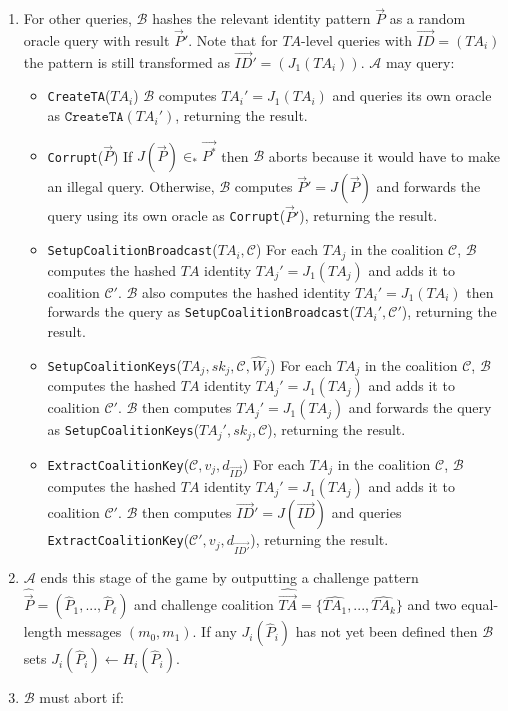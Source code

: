 \documentclass[10pt]{llncs}
\newcommand{\A}{\mathcal{A}}
\newcommand{\B}{\mathcal{B}}
\newcommand{\C}{\mathcal{C}}
\newcommand{\ID}{\mathit{ID}}
\newcommand{\TA}{\mathit{TA}}
\newcommand{\sk}{\mathit{sk}}
\begin{document}
\begin{enumerate}
	\item For other queries, $\B$ hashes the relevant identity pattern $\vec{P}$ as a random oracle query with result $\vec{P}'$. Note that for $\TA$-level queries with $\vec{\ID} = (\TA_i)$ the pattern is still transformed as $\vec{\ID}' = (J_1 (\TA_i))$. $\A$ may query:
	\begin{itemize}
		\item \texttt{CreateTA}($\TA_i$) $\B$ computes $\TA_i' = J_1(\TA_i)$ and queries its own oracle as $\texttt{CreateTA}(\TA_i')$, returning the result.
		\item \texttt{Corrupt}($\vec{P}$) If $J(\vec{P}) \in_* \vec{P^*}$ then $\B$ aborts because it would have to make an illegal query. Otherwise, $\B$ computes $\vec{P}' = J(\vec{P})$ and forwards the query using its own oracle as \texttt{Corrupt}($\vec{P}'$), returning the result.
		\item \texttt{SetupCoalitionBroadcast}($\TA_i, \C$) For each $\TA_j$ in the coalition $\C$, $\B$ computes the hashed $\TA$ identity $\TA_j' = J_1(\TA_j)$ and adds it to coalition $\C'$. $\B$ also computes the hashed identity $\TA_i' = J_1(\TA_i)$ then forwards the query as \texttt{SetupCoalitionBroadcast}($\TA_i', \C'$), returning the result.
		\item \texttt{SetupCoalitionKeys}($\TA_j, \sk_j, \C, \hat{W}_j$) For each $\TA_j$ in the coalition $\C$, $\B$ computes the hashed $\TA$ identity $\TA_j' = J_1(\TA_j)$ and adds it to coalition $\C'$. $\B$ then computes $\TA_j' = J_1(\TA_j)$ and forwards the query as \texttt{SetupCoalitionKeys}($\TA_j', \sk_j, \C$), returning the result.
		\item \texttt{ExtractCoalitionKey}($\C, v_j, d_{\vec{\ID}}$) For each $\TA_j$ in the coalition $\C$, $\B$ computes the hashed $\TA$ identity $\TA_j' = J_1(\TA_j)$ and adds it to coalition $\C'$. $\B$ then computes $\vec{\ID}' = J(\vec{\ID})$ and queries \texttt{ExtractCoalitionKey}($\C', v_j, d_{\vec{\ID'}}$), returning the result.
	\end{itemize}
	\item $\A$ ends this stage of the game by outputting a challenge pattern $\widehat{\vec{P}} = (\widehat{P}_1, ..., \widehat{P}_{\ell})$ and challenge coalition $\widehat{\vec{\TA}} = \{\widehat{\TA_1}, ..., \widehat{\TA_k}\}$ and two equal-length messages $(m_0, m_1)$. If any $J_i(\widehat{P}_i)$ has not yet been defined then $\B$ sets $J_i(\widehat{P}_i) \gets H_i(\widehat{P}_i)$.
	\item $\B$ must abort if:
		\begin{itemize}

\end{itemize}
\end{enumerate}
\end{document}
